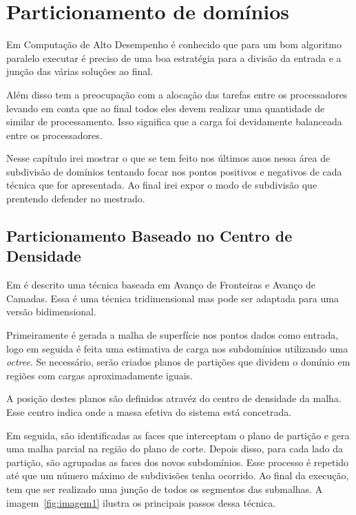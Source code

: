 \pagestyle{empty}
\cleardoublepage
\pagestyle{fancy}
\chapter{Particionamento de domínios}\label{cap2}

Em Computação de Alto Desempenho é conhecido que para um bom algoritmo paralelo executar é preciso de uma boa estratégia para a divisão da entrada e a junção das várias soluções ao final. 

Além disso tem a preocupação com a alocação das tarefas entre os processadores levando em conta que ao final todos eles devem realizar uma quantidade de similar de processamento. Isso significa que a carga foi devidamente balanceada entre os processadores.

Nesse capítulo irei mostrar o que se tem feito nos últimos anos nessa área de subdivisão de domínios tentando focar nos pontos positivos e negativos de cada técnica que for apresentada. Ao final irei expor o modo de subdivisão que prentendo defender no mestrado.



\section{Particionamento Baseado no Centro de Densidade}

Em \citet{bib:Pirzadeh09} é descrito uma técnica baseada em Avanço de Fronteiras e Avanço de Camadas. Essa é uma técnica tridimensional mas pode ser adaptada para uma versão bidimensional.

Primeiramente é gerada a malha de superfície nos pontos dados como entrada, logo em seguida é feita uma estimativa de carga nos subdomínios utilizando uma \textit{octree}. Se necessário, serão criados planos de partições que dividem o domínio em regiões com cargas aproximadamente iguais. 

A posição destes planos são definidos atravéz do centro de densidade da malha. Esse centro indica onde a massa efetiva do sistema está concetrada.

Em seguida, são identificadas as faces que interceptam o plano de partição e gera uma malha parcial na região do plano de corte. Depois disso, para cada lado da partição, são agrupadas as faces dos novos subdomínios. Esse processo é repetido até que um número máximo de subdivisões tenha ocorrido. Ao final da execução, tem que ser realizado uma junção de todos os segmentos das submalhas. A imagem~\ref{fig:imagem1} ilustra os principais passos dessa técnica.

